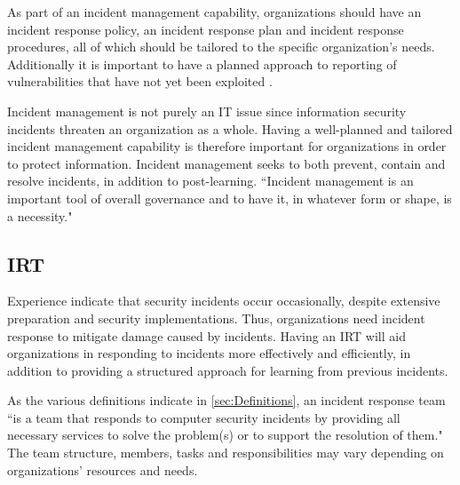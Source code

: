 As part of an incident management capability, organizations should have an incident response policy, an incident response plan and incident response procedures, all of which should be tailored to the specific organization's needs. Additionally it is important to have a planned approach to reporting of vulnerabilities that have not yet been exploited \cite{ISO/IEC27035}.



Incident management is not purely an IT issue since information security incidents threaten an organization as a whole. Having a well-planned and tailored incident management capability is therefore important for organizations in order to protect information. Incident management seeks to both prevent, contain and resolve incidents, in addition to post-learning. ``Incident management is an important tool of overall governance and to have it, in whatever form or shape, is a necessity\cite{enisaGuide}." 

\subsection{\acl{IRT}}
Experience indicate that security incidents occur occasionally, despite extensive preparation and security implementations. Thus, organizations need incident response to mitigate damage caused by incidents. Having an \ac{IRT} will aid organizations in responding to incidents more effectively and efficiently, in addition to providing a structured approach for learning from previous incidents. 

As the various definitions indicate in \ref{sec:Definitions}, an incident response team ``is a team that responds to computer security incidents by providing all necessary services to solve the problem(s) or to support the resolution of them\cite{enisaCSIRTGoodPractices}." The team structure, members, tasks and responsibilities may vary depending on organizations' resources and needs. 

